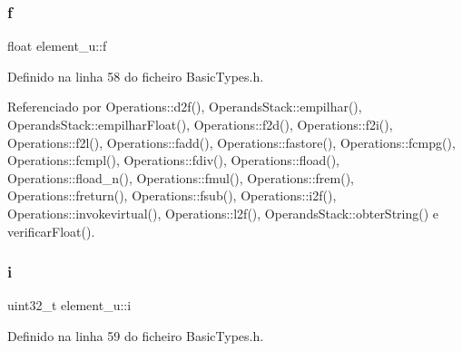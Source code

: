 \mbox{\label{unionelement__u_ad3caae754d93e7fa606a0756f5ddc6a6}} 
\subsubsection{\texorpdfstring{f}{f}}
{\footnotesize\ttfamily float element\+\_\+u\+::f}



Definido na linha 58 do ficheiro Basic\+Types.\+h.



Referenciado por Operations\+::d2f(), Operands\+Stack\+::empilhar(), Operands\+Stack\+::empilhar\+Float(), Operations\+::f2d(), Operations\+::f2i(), Operations\+::f2l(), Operations\+::fadd(), Operations\+::fastore(), Operations\+::fcmpg(), Operations\+::fcmpl(), Operations\+::fdiv(), Operations\+::fload(), Operations\+::fload\+\_\+n(), Operations\+::fmul(), Operations\+::frem(), Operations\+::freturn(), Operations\+::fsub(), Operations\+::i2f(), Operations\+::invokevirtual(), Operations\+::l2f(), Operands\+Stack\+::obter\+String() e verificar\+Float().

\mbox{\label{unionelement__u_ac1564bf5b02b69382469449ba266dc9a}} 
\subsubsection{\texorpdfstring{i}{i}}
{\footnotesize\ttfamily uint32\+\_\+t element\+\_\+u\+::i}



Definido na linha 59 do ficheiro Basic\+Types.\+h.



